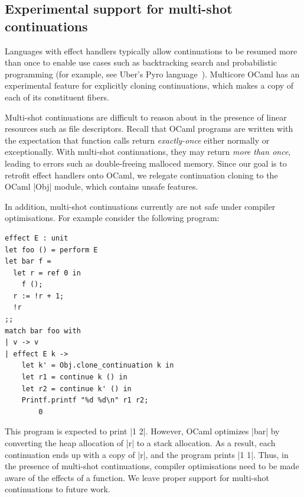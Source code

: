 \documentclass[sigplan,10pt,review,anonymous]{acmart}\settopmatter{printfolios=true,printccs=false,printacmref=false}
\begin{document}
\subsection*{Experimental support for multi-shot continuations}

Languages with effect handlers typically allow continuations to be resumed more
than once to enable use cases such as backtracking search and probabilistic
programming (for example, see Uber's Pyro language~\cite{Pyro}). Multicore
OCaml has an experimental feature for explicitly cloning continuations, which
makes a copy of each of its constituent fibers.

Multi-shot continuations are difficult to
reason about in the presence of linear resources such as file descriptors.
Recall that OCaml programs are written with the expectation that function calls
return \emph{exactly-once} either normally or exceptionally. With multi-shot
continuations, they may return \emph{more than once}, leading to errors such as
double-freeing malloced memory. Since our goal is to retrofit effect handlers
onto OCaml, we relegate continuation cloning to the OCaml |Obj| module, which
contains unsafe features.

In addition, multi-shot continuations currently are not safe under compiler
optimisations. For example consider the following program:

\begin{minipage}{\linewidth}
\begin{lstlisting}
effect E : unit
let foo () = perform E
let bar f =
  let r = ref 0 in
	f ();
  r := !r + 1;
  !r
;;
match bar foo with
| v -> v
| effect E k ->
    let k' = Obj.clone_continuation k in
    let r1 = continue k () in
    let r2 = continue k' () in
    Printf.printf "%d %d\n" r1 r2;
		0
\end{lstlisting}
\end{minipage}

This program is expected to print |1 2|. However, OCaml optimizes |bar| by
converting the heap allocation of |r| to a stack allocation. As a result, each
continuation ends up with a copy of |r|, and the program prints |1 1|. Thus, in
the presence of multi-shot continuations, compiler optimisations need to be
made aware of the effects of a function. We leave proper support for multi-shot
continuations to future work.
\end{document}
